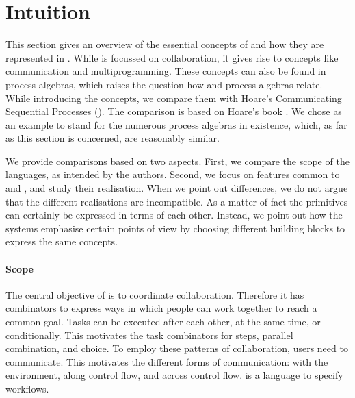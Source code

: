 


\section{Intuition}
\label{sec:comparison}

This section gives an overview of the essential concepts of \TOP and how they are represented in \TOPHAT.
While \TOP is focussed on collaboration, it gives rise to concepts like communication and multiprogramming.
These concepts can also be found in process algebras, which raises the question how \TOPHAT and process algebras relate.
While introducing the concepts, we compare them with Hoare's Communicating Sequential Processes (\CSP).
The comparison is based on Hoare's book \cite{books/Hoare85CSP}.
We chose \CSP as an example to stand for the numerous process algebras in existence, which, as far as this section is concerned, are reasonably similar.

We provide comparisons based on two aspects.
First, we compare the scope of the languages, as intended by the authors.
Second, we focus on features common to \TOP and \CSP, and study their realisation.
When we point out differences, we do not argue that the different realisations are incompatible.
As a matter of fact the primitives can certainly be expressed in terms of each other.
Instead, we point out how the systems emphasise certain points of view by choosing different building blocks to express the same concepts.



\paragraph{Scope}

The central objective of \TOP is to coordinate collaboration.
Therefore it has combinators to express ways in which people can work together to reach a common goal.
Tasks can be executed after each other, at the same time, or conditionally.
This motivates the task combinators for steps, parallel combination, and choice.
To employ these patterns of collaboration, users need to communicate.
This motivates the different forms of communication: with the environment, along control flow, and across control flow.
\TOPHAT is a language to specify workflows.

